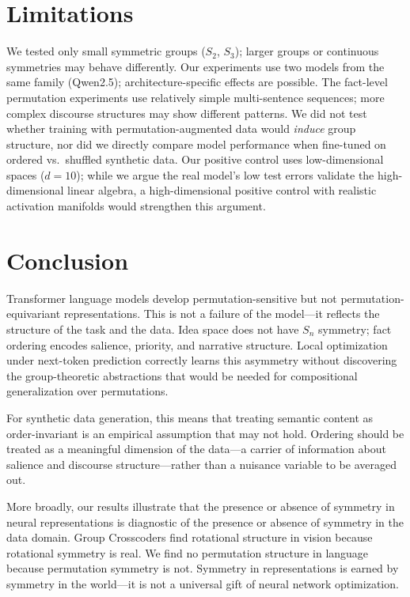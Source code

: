 \documentclass[10pt, letterpaper]{article}
\begin{document}
\section{Limitations}
\label{sec:limitations}

We tested only small symmetric groups ($S_2$, $S_3$); larger groups or continuous symmetries may behave differently. Our experiments use two models from the same family (Qwen2.5); architecture-specific effects are possible. The fact-level permutation experiments use relatively simple multi-sentence sequences; more complex discourse structures may show different patterns. We did not test whether training with permutation-augmented data would \emph{induce} group structure, nor did we directly compare model performance when fine-tuned on ordered vs.\ shuffled synthetic data. Our positive control uses low-dimensional spaces ($d = 10$); while we argue the real model's low test errors validate the high-dimensional linear algebra, a high-dimensional positive control with realistic activation manifolds would strengthen this argument.

\section{Conclusion}
\label{sec:conclusion}

Transformer language models develop permutation-sensitive but not permutation-equivariant representations. This is not a failure of the model---it reflects the structure of the task and the data. Idea space does not have $S_n$ symmetry; fact ordering encodes salience, priority, and narrative structure. Local optimization under next-token prediction correctly learns this asymmetry without discovering the group-theoretic abstractions that would be needed for compositional generalization over permutations.

For synthetic data generation, this means that treating semantic content as order-invariant is an empirical assumption that may not hold. Ordering should be treated as a meaningful dimension of the data---a carrier of information about salience and discourse structure---rather than a nuisance variable to be averaged out.

More broadly, our results illustrate that the presence or absence of symmetry in neural representations is diagnostic of the presence or absence of symmetry in the data domain. Group Crosscoders find rotational structure in vision because rotational symmetry is real. We find no permutation structure in language because permutation symmetry is not. Symmetry in representations is earned by symmetry in the world---it is not a universal gift of neural network optimization.
\end{document}
